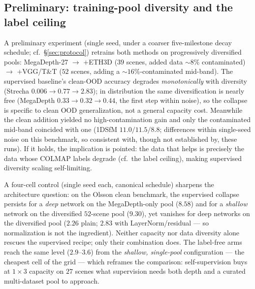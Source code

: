 \documentclass{article}
\begin{document}
\subsection{Preliminary: training-pool diversity and the label ceiling}
A preliminary experiment (single seed, under a coarser five-milestone decay schedule;
cf.\ \S\ref{sec:protocol}) retrains both methods on progressively diversified pools: MegaDepth-27
$\to$ $+$ETH3D ($39$ scenes, added data ${\sim}8\%$ contaminated) $\to$ $+$VGG/T\&T ($52$
scenes, adding a ${\sim}16\%$-contaminated mid-band). The supervised baseline's clean-OOD
accuracy degrades \emph{monotonically} with diversity (Strecha
$0.006\!\to\!0.77\!\to\!2.83$); in distribution the same diversification is nearly
free (MegaDepth $0.33\!\to\!0.32\!\to\!0.44$, the first step within noise), so the
collapse is specific to clean OOD generalization, not a general capacity cost. Meanwhile the clean addition yielded no high-contamination
gain and only the contaminated mid-band coincided with one (1DSfM $11.0/11.5/8.8$;
differences within single-seed noise on this benchmark, so consistent with, though not
established by, these runs). If it holds, the implication is pointed: the data that
helps is precisely the data whose COLMAP labels degrade (cf.\ the label ceiling), making
supervised diversity scaling self-limiting.

A four-cell control (single seed each, canonical schedule) sharpens the architecture
question: on the Olsson clean benchmark, the supervised collapse persists for a
\emph{deep} network on the MegaDepth-only pool ($8.58$) and for a \emph{shallow} network
on the diversified $52$-scene pool ($9.30$), yet vanishes for deep networks on the
diversified pool ($2.26$ plain; $2.83$ with LayerNorm/residual --- so normalization is
not the ingredient). Neither capacity nor data diversity alone rescues the supervised
recipe; only their combination does. The label-free arms reach the same level
($2.9$--$3.6$) from the \emph{shallow, single-pool} configuration --- the cheapest cell
of the grid --- which reframes the comparison: self-supervision buys at $1{\times}3$
capacity on $27$ scenes what supervision needs both depth and a curated multi-dataset
pool to approach.
\end{document}
